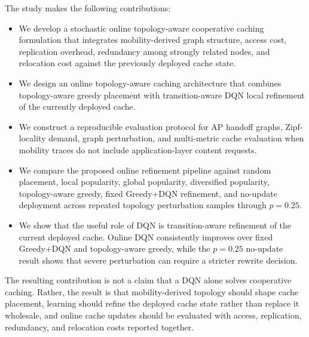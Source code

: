 The study makes the following contributions:
\begin{itemize}
    \item We develop a stochastic online topology-aware cooperative caching formulation that integrates mobility-derived graph structure, access cost, replication overhead, redundancy among strongly related nodes, and relocation cost against the previously deployed cache state.
    \item We design an online topology-aware caching architecture that combines topology-aware greedy placement with transition-aware DQN local refinement of the currently deployed cache.
    \item We construct a reproducible evaluation protocol for AP handoff graphs, Zipf-locality demand, graph perturbation, and multi-metric cache evaluation when mobility traces do not include application-layer content requests.
    \item We compare the proposed online refinement pipeline against random placement, local popularity, global popularity, diversified popularity, topology-aware greedy, fixed Greedy+DQN refinement, and no-update deployment across repeated topology perturbation samples through \(p=0.25\).
    \item We show that the useful role of DQN is transition-aware refinement of the current deployed cache. Online DQN consistently improves over fixed Greedy+DQN and topology-aware greedy, while the \(p=0.25\) no-update result shows that severe perturbation can require a stricter rewrite decision.
\end{itemize}

The resulting contribution is not a claim that a DQN alone solves cooperative caching. Rather, the result is that mobility-derived topology should shape cache placement, learning should refine the deployed cache state rather than replace it wholesale, and online cache updates should be evaluated with access, replication, redundancy, and relocation costs reported together.
